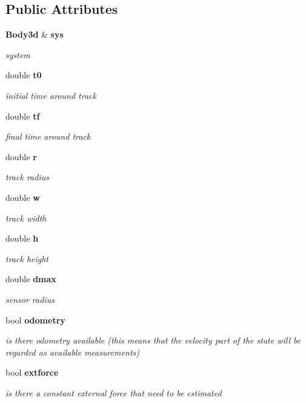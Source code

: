 \subsection*{\-Public \-Attributes}
\begin{DoxyCompactItemize}
\item 
{\bf \-Body3d} \& {\bf sys}
\begin{DoxyCompactList}\small\item\em system \end{DoxyCompactList}\item 
double {\bf t0}
\begin{DoxyCompactList}\small\item\em initial time around track \end{DoxyCompactList}\item 
double {\bf tf}
\begin{DoxyCompactList}\small\item\em final time around track \end{DoxyCompactList}\item 
double {\bf r}
\begin{DoxyCompactList}\small\item\em track radius \end{DoxyCompactList}\item 
double {\bf w}
\begin{DoxyCompactList}\small\item\em track width \end{DoxyCompactList}\item 
double {\bf h}
\begin{DoxyCompactList}\small\item\em track height \end{DoxyCompactList}\item 
double {\bf dmax}
\begin{DoxyCompactList}\small\item\em sensor radius \end{DoxyCompactList}\item 
bool {\bf odometry}
\begin{DoxyCompactList}\small\item\em is there odometry available (this means that the velocity part of the state will be regarded as available measurements) \end{DoxyCompactList}\item 
bool {\bf extforce}
\begin{DoxyCompactList}\small\item\em is there a constant external force that need to be estimated \end{DoxyCompactList}\item 

\end{DoxyCompactItemize}
